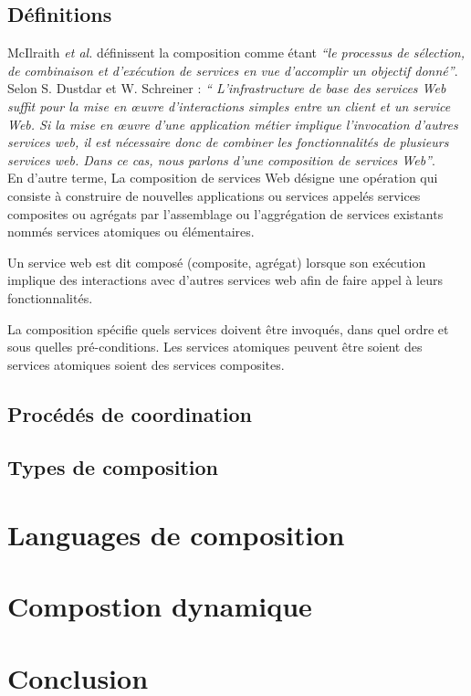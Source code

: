     \subsection{Définitions}
    \label{sec:definitions}

    McIlraith \emph{et al.} \cite{mcilraith2003bringing} définissent la composition comme étant 
    \emph{``le processus de sélection, de combinaison et d'exécution de services en vue
      d'accomplir un objectif donné''}.\\
  
    Selon S. Dustdar et W. Schreiner \cite{dustdar2005survey} : \emph{`` L'infrastructure de 
      base des services Web suffit pour la mise en œuvre d'interactions simples entre un 
      client et un service Web. Si la mise en œuvre d'une application métier implique l'invocation 
      d'autres services web, il est nécessaire donc de combiner les fonctionnalités de plusieurs 
      services web. Dans ce cas, nous parlons d'une composition de services Web''}.\\

    En d'autre terme, La composition de services Web désigne une opération qui consiste 
    à construire de nouvelles applications ou services appelés services composites ou agrégats par 
    l'assemblage ou l'aggrégation de services existants nommés services atomiques ou élémentaires.

    Un service web est dit composé (composite, agrégat) lorsque son exécution implique des
    interactions avec d'autres services web afin de faire appel à leurs fonctionnalités.

    La composition spécifie quels services doivent être invoqués, dans quel ordre et sous
    quelles pré-conditions. Les services atomiques peuvent être soient des services atomiques
    soient des services composites.
    
      
      \subsection{Procédés de coordination}
      \label{sec:proc-de-coord}      

      \subsection{Types de composition}
      \label{sec:types-de-composition}

  \section{Languages de composition}
  \label{sec:lang-de-comp}



  \section{Compostion dynamique}
  \label{sec:comp-dynam}
 
  \section{Conclusion}  
  \label{sec:conclusion}
 

